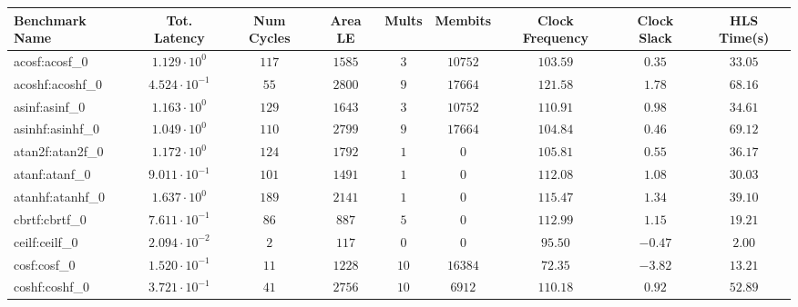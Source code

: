 \begin{tabular}{|l|c|c|c|c|c|c|c|c|}
\hline
Benchmark Name               & Tot. Latency            & Num Cycles & Area LE   & Mults   & Membits    & Clock Frequency & Clock Slack & HLS Time(s) \\
\hline
acosf:acosf\_0               & $ 1.129 \cdot 10^{0}  $ & $ 117    $ & $ 1585  $ & $ 3   $ & $ 10752  $ & $ 103.59      $ & $ 0.35    $ & $ 33.05   $ \\
acoshf:acoshf\_0             & $ 4.524 \cdot 10^{-1} $ & $ 55     $ & $ 2800  $ & $ 9   $ & $ 17664  $ & $ 121.58      $ & $ 1.78    $ & $ 68.16   $ \\
asinf:asinf\_0               & $ 1.163 \cdot 10^{0}  $ & $ 129    $ & $ 1643  $ & $ 3   $ & $ 10752  $ & $ 110.91      $ & $ 0.98    $ & $ 34.61   $ \\
asinhf:asinhf\_0             & $ 1.049 \cdot 10^{0}  $ & $ 110    $ & $ 2799  $ & $ 9   $ & $ 17664  $ & $ 104.84      $ & $ 0.46    $ & $ 69.12   $ \\
atan2f:atan2f\_0             & $ 1.172 \cdot 10^{0}  $ & $ 124    $ & $ 1792  $ & $ 1   $ & $ 0      $ & $ 105.81      $ & $ 0.55    $ & $ 36.17   $ \\
atanf:atanf\_0               & $ 9.011 \cdot 10^{-1} $ & $ 101    $ & $ 1491  $ & $ 1   $ & $ 0      $ & $ 112.08      $ & $ 1.08    $ & $ 30.03   $ \\
atanhf:atanhf\_0             & $ 1.637 \cdot 10^{0}  $ & $ 189    $ & $ 2141  $ & $ 1   $ & $ 0      $ & $ 115.47      $ & $ 1.34    $ & $ 39.10   $ \\
cbrtf:cbrtf\_0               & $ 7.611 \cdot 10^{-1} $ & $ 86     $ & $ 887   $ & $ 5   $ & $ 0      $ & $ 112.99      $ & $ 1.15    $ & $ 19.21   $ \\
ceilf:ceilf\_0               & $ 2.094 \cdot 10^{-2} $ & $ 2      $ & $ 117   $ & $ 0   $ & $ 0      $ & $ 95.50       $ & $ -0.47   $ & $ 2.00    $ \\
cosf:cosf\_0                 & $ 1.520 \cdot 10^{-1} $ & $ 11     $ & $ 1228  $ & $ 10  $ & $ 16384  $ & $ 72.35       $ & $ -3.82   $ & $ 13.21   $ \\
coshf:coshf\_0               & $ 3.721 \cdot 10^{-1} $ & $ 41     $ & $ 2756  $ & $ 10  $ & $ 6912   $ & $ 110.18      $ & $ 0.92    $ & $ 52.89   $ \\

\end{tabular}
